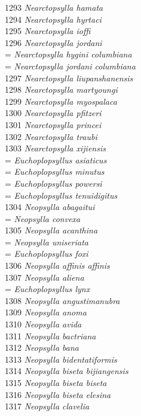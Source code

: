 \documentclass[
]{article}
\begin{document}
1293 \emph{Nearctopsylla hamata}\\
1294 \emph{Nearctopsylla hyrtaci}\\
1295 \emph{Nearctopsylla ioffi}\\
1296 \emph{Nearctopsylla jordani}\\
= \emph{Nearctopsylla hygini columbiana}\\
= \emph{Nearctopsylla jordani columbiana}\\
1297 \emph{Nearctopsylla liupanshanensis}\\
1298 \emph{Nearctopsylla martyoungi}\\
1299 \emph{Nearctopsylla myospalaca}\\
1300 \emph{Nearctopsylla pfitzeri}\\
1301 \emph{Nearctopsylla princei}\\
1302 \emph{Nearctopsylla traubi}\\
1303 \emph{Nearctopsylla xijiensis}\\
= \emph{Euchoplopsyllus asiaticus}\\
= \emph{Euchoplopsyllus minutus}\\
= \emph{Euchoplopsyllus powersi}\\
= \emph{Euchoplopsyllus tenuidigitus}\\
1304 \emph{Neopsylla abagaitui}\\
= \emph{Neopsylla convexa}\\
1305 \emph{Neopsylla acanthina}\\
= \emph{Neopsylla uniseriata}\\
= \emph{Euchoplopsyllus foxi}\\
1306 \emph{Neopsylla affinis affinis}\\
1307 \emph{Neopsylla aliena}\\
= \emph{Euchoplopsyllus lynx}\\
1308 \emph{Neopsylla angustimanubra}\\
1309 \emph{Neopsylla anoma}\\
1310 \emph{Neopsylla avida}\\
1311 \emph{Neopsylla bactriana}\\
1312 \emph{Neopsylla bana}\\
1313 \emph{Neopsylla bidentatiformis}\\
1314 \emph{Neopsylla biseta bijiangensis}\\
1315 \emph{Neopsylla biseta biseta}\\
1316 \emph{Neopsylla biseta elesina}\\
1317 \emph{Neopsylla clavelia}\\
\end{document}
